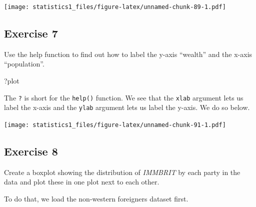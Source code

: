 \documentclass[]{book}
\newenvironment{Shaded}{\begin{snugshade}}{\end{snugshade}}
\newcommand{\KeywordTok}[1]{\textcolor[rgb]{0.13,0.29,0.53}{\textbf{#1}}}
\newcommand{\DataTypeTok}[1]{\textcolor[rgb]{0.13,0.29,0.53}{#1}}
\newcommand{\StringTok}[1]{\textcolor[rgb]{0.31,0.60,0.02}{#1}}
\newcommand{\CommentTok}[1]{\textcolor[rgb]{0.56,0.35,0.01}{\textit{#1}}}
\newcommand{\OperatorTok}[1]{\textcolor[rgb]{0.81,0.36,0.00}{\textbf{#1}}}
\newcommand{\NormalTok}[1]{#1}
\theoremstyle{definition}
\theoremstyle{definition}
\theoremstyle{definition}
\theoremstyle{remark}
\begin{document}
\texttt{[image: statistics1\_files/figure-latex/unnamed-chunk-89-1.pdf]}

\subsection{Exercise 7}\label{exercise-7-1}

Use the help function to find out how to label the y-axis ``wealth'' and
the x-axis ``population''.

\begin{Shaded}
\begin{Highlighting}[]
\NormalTok{?plot}
\end{Highlighting}
\end{Shaded}

The \texttt{?} is short for the \texttt{help()} function. We see that
the \texttt{xlab} argument lets us label the x-axis and the
\texttt{ylab} argument lets us label the y-axis. We do so below.

\begin{Shaded}
\end{Shaded}

\texttt{[image: statistics1\_files/figure-latex/unnamed-chunk-91-1.pdf]}

\subsection{Exercise 8}\label{exercise-8-1}

Create a boxplot showing the distribution of \emph{IMMBRIT} by each
party in the data and plot these in one plot next to each other.

To do that, we load the non-western foreigners dataset first.
\end{document}

